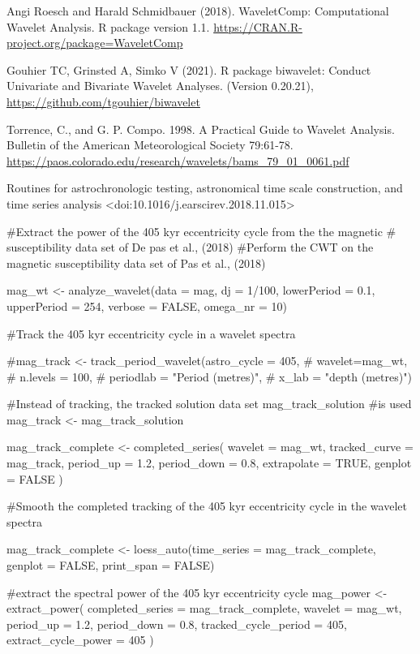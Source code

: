 \documentclass[a4paper]{book}
\begin{document}
%
\begin{References}
Angi Roesch and Harald Schmidbauer (2018). WaveletComp: Computational
Wavelet Analysis. R package version 1.1.
\url{https://CRAN.R-project.org/package=WaveletComp}

Gouhier TC, Grinsted A, Simko V (2021). R package biwavelet: Conduct Univariate and Bivariate Wavelet Analyses. (Version 0.20.21),
\url{https://github.com/tgouhier/biwavelet}

Torrence, C., and G. P. Compo. 1998. A Practical Guide to Wavelet Analysis.
Bulletin of the American Meteorological Society 79:61-78.
\url{https://paos.colorado.edu/research/wavelets/bams_79_01_0061.pdf}

Routines for astrochronologic testing, astronomical time scale construction, and
time series analysis <doi:10.1016/j.earscirev.2018.11.015>
\end{References}
%
\begin{Examples}
\begin{ExampleCode}
#Extract the power of the 405 kyr eccentricity cycle from the the magnetic
# susceptibility data set of De pas et al., (2018)
#Perform the CWT on the magnetic susceptibility data set of Pas et al., (2018)

mag_wt <- analyze_wavelet(data = mag,
dj = 1/100,
lowerPeriod = 0.1,
upperPeriod = 254,
verbose = FALSE,
omega_nr = 10)

#Track the 405 kyr eccentricity cycle in a wavelet spectra

#mag_track <- track_period_wavelet(astro_cycle = 405,
#                                   wavelet=mag_wt,
#                                   n.levels = 100,
#                                   periodlab = "Period (metres)",
#                                   x_lab = "depth (metres)")

#Instead of tracking, the tracked solution data set mag_track_solution
#is used
mag_track <- mag_track_solution

mag_track_complete <- completed_series(
  wavelet = mag_wt,
  tracked_curve = mag_track,
  period_up = 1.2,
  period_down = 0.8,
  extrapolate = TRUE,
  genplot = FALSE
)

#Smooth the completed tracking of the 405 kyr eccentricity cycle in the wavelet spectra

mag_track_complete <- loess_auto(time_series = mag_track_complete,
genplot = FALSE, print_span = FALSE)

#extract the spectral power of the 405 kyr eccentricity cycle
mag_power <- extract_power(
completed_series = mag_track_complete,
wavelet = mag_wt,
period_up = 1.2,
period_down = 0.8,
tracked_cycle_period = 405,
extract_cycle_power = 405
)

\end{ExampleCode}
\end{Examples}
\end{document}
